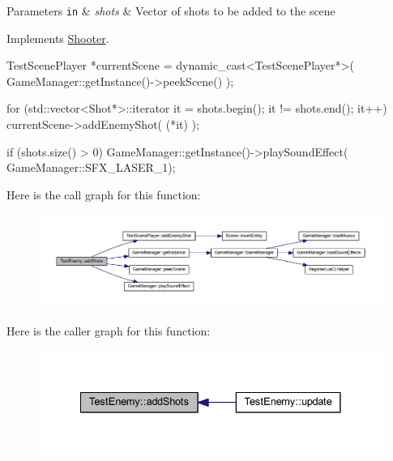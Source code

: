 \begin{DoxyParams}[1]{Parameters}
\mbox{\tt in}  & {\em shots} & Vector of shots to be added to the scene \\
\hline
\end{DoxyParams}


Implements \hyperlink{class_shooter_ac632e56f3cc571f6d140767ba33053e8}{Shooter}.


\begin{DoxyCode}
{
        TestScenePlayer *currentScene = dynamic_cast<TestScenePlayer*>( 
      GameManager::getInstance()->peekScene() );

        for (std::vector<Shot*>::iterator it = shots.begin(); it != shots.end(); 
      it++)
        {
                currentScene->addEnemyShot( (*it) );
        }

        if (shots.size() > 0)
        {
                GameManager::getInstance()->playSoundEffect(
      GameManager::SFX_LASER_1);
        }
}
\end{DoxyCode}


Here is the call graph for this function:
\nopagebreak
\begin{figure}[H]
\begin{center}
\leavevmode
\includegraphics[width=400pt]{dd/d78/class_test_enemy_a384031359eccc8648ecdfa533911e0a0_cgraph}
\end{center}
\end{figure}




Here is the caller graph for this function:
\nopagebreak
\begin{figure}[H]
\begin{center}
\leavevmode
\includegraphics[width=332pt]{dd/d78/class_test_enemy_a384031359eccc8648ecdfa533911e0a0_icgraph}
\end{center}
\end{figure}


